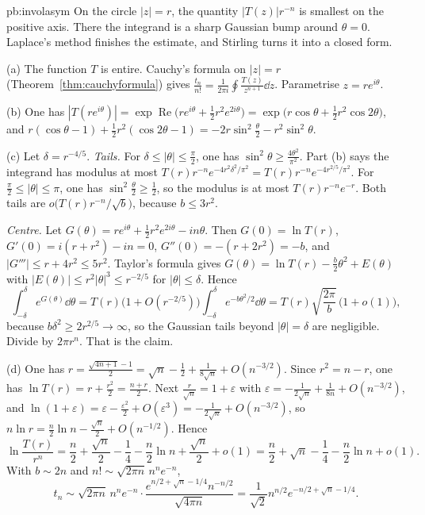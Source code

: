 \begin{solution}{pb:involasym}
\idea On the circle $|z|=r$, the quantity $|T(z)|r^{-n}$ is smallest on the positive axis. There the integrand is a sharp Gaussian bump around $\theta=0$. Laplace's method
finishes the estimate, and Stirling turns it into a closed form.

\writeup (a) The function $T$ is entire. Cauchy's formula on $|z|=r$ (Theorem~\ref{thm:cauchyformula}) gives $\frac{t_n}{n!}=\frac1{2\pi i}\oint\frac{T(z)}{z^{n+1}}\dd z$. Parametrise $z=re^{i\theta}$.

(b) One has $|T(re^{i\theta})|=\exp\operatorname{Re}\bigl(re^{i\theta}+\frac12r^2e^{2i\theta}\bigr)=\exp\bigl(r\cos\theta+\frac12r^2\cos2\theta\bigr)$, and
$r(\cos\theta-1)+\frac12r^2(\cos2\theta-1)=-2r\sin^2\frac\theta2-r^2\sin^2\theta$.

(c) Let $\delta=r^{-4/5}$. \emph{Tails.} For $\delta\le|\theta|\le\frac\pi2$, one has $\sin^2\theta\ge\frac{4\theta^2}{\pi^2}$. Part (b) says the integrand has modulus at most
$T(r)r^{-n}e^{-4r^2\delta^2/\pi^2}=T(r)r^{-n}e^{-4r^{2/5}/\pi^2}$. For $\frac\pi2\le|\theta|\le\pi$, one has $\sin^2\frac\theta2\ge\frac12$, so the modulus is at most $T(r)r^{-n}e^{-r}$. Both tails are
$o\bigl(T(r)r^{-n}/\sqrt b\bigr)$, because $b\le3r^2$.

\emph{Centre.} Let $G(\theta)=re^{i\theta}+\frac12r^2e^{2i\theta}-in\theta$. Then $G(0)=\ln T(r)$, $G'(0)=i(r+r^2)-in=0$, $G''(0)=-(r+2r^2)=-b$, and $|G'''|\le r+4r^2\le5r^2$. Taylor's formula gives
$G(\theta)=\ln T(r)-\frac b2\theta^2+E(\theta)$ with $|E(\theta)|\le r^2|\theta|^3\le r^{-2/5}$ for $|\theta|\le\delta$. Hence
\[
\int_{-\delta}^\delta e^{G(\theta)}\dd\theta=T(r)\bigl(1+O(r^{-2/5})\bigr)\int_{-\delta}^\delta e^{-b\theta^2/2}\dd\theta=T(r)\sqrt{\frac{2\pi}b}\,\bigl(1+o(1)\bigr),
\]
because $b\delta^2\ge2r^{2/5}\to\infty$, so the Gaussian tails beyond $|\theta|=\delta$ are negligible. Divide by $2\pi r^n$. That is the claim.

(d) One has $r=\frac{\sqrt{4n+1}-1}2=\sqrt n-\frac12+\frac1{8\sqrt n}+O(n^{-3/2})$. Since $r^2=n-r$, one has $\ln T(r)=r+\frac{r^2}2=\frac{n+r}2$. Next $\frac r{\sqrt n}=1+\varepsilon$ with
$\varepsilon=-\frac1{2\sqrt n}+\frac1{8n}+O(n^{-3/2})$, and $\ln(1+\varepsilon)=\varepsilon-\frac{\varepsilon^2}2+O(\varepsilon^3)=-\frac1{2\sqrt n}+O(n^{-3/2})$, so $n\ln r=\frac n2\ln n-\frac{\sqrt n}2+O(n^{-1/2})$. Hence
\[
\ln\frac{T(r)}{r^n}=\frac n2+\frac{\sqrt n}2-\frac14-\frac n2\ln n+\frac{\sqrt n}2+o(1)=\frac n2+\sqrt n-\frac14-\frac n2\ln n+o(1).
\]
With $b\sim2n$ and $n!\sim\sqrt{2\pi n}\,n^ne^{-n}$,
\[
t_n\sim\sqrt{2\pi n}\,n^ne^{-n}\cdot\frac{e^{n/2+\sqrt n-1/4}n^{-n/2}}{\sqrt{4\pi n}}=\frac1{\sqrt2}n^{n/2}e^{-n/2+\sqrt n-1/4}.
\]


\end{solution}
